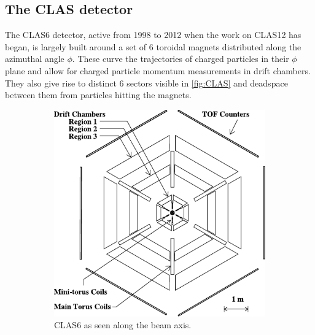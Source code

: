 \documentclass[a4paper,12pt]{article}
\begin{document}
\subsection{The CLAS detector}
The CLAS6 detector, active from 1998 to 2012 when the work on CLAS12 has began, is largely built around a set of 6 toroidal magnets distributed along the azimuthal angle $\phi$.
These curve the trajectories of charged particles in their $\phi$ plane and allow for charged particle momentum measurements in drift chambers.
They also give rise to distinct 6 sectors visible in \cref{fig:CLAS} and deadspace between them from particles hitting the magnets.

\begin{figure}[h]
    \centering
    \begin{subfigure}[b]{0.45\textwidth}
        \centering
        \includegraphics[width=\textwidth]{figures/CLAS_headon.pdf}
        \caption{CLAS6 as seen along the beam axis.}
    \end{subfigure}
    \hfill
    \begin{subfigure}[b]{0.5\textwidth}
        \centering

\end{subfigure}
\end{figure}
\end{document}
